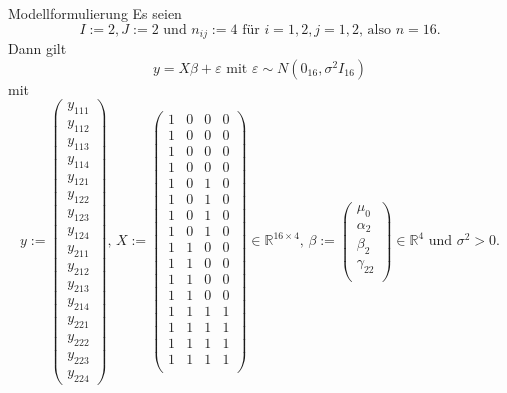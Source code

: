 \documentclass[
  8pt,
  ignorenonframetext,
]{beamer}
\begin{document}
\begin{frame}{Modellformulierung}
Es seien \begin{equation}
I := 2, J := 2 \mbox{ und } n_{ij} := 4 \mbox{ für } i = 1,2, j = 1,2 \mbox{, also } n = 16.
\end{equation} Dann gilt \begin{equation}
y = X\beta + \varepsilon \mbox{ mit } \varepsilon \sim N(0_{16},\sigma^2 I_{16})
\end{equation} mit \footnotesize \begin{equation}
y :=
\begin{pmatrix}
y_{111} \\
y_{112} \\
y_{113} \\
y_{114} \\
y_{121} \\
y_{122} \\
y_{123} \\
y_{124} \\
y_{211} \\
y_{212} \\
y_{213} \\
y_{214} \\
y_{221} \\
y_{222} \\
y_{223} \\
y_{224}
\end{pmatrix},
\,
X :=
\begin{pmatrix}
1  &  0  &   0   &  0  \\
1  &  0  &   0   &  0  \\
1  &  0  &   0   &  0  \\
1  &  0  &   0   &  0  \\
1  &  0  &   1   &  0  \\
1  &  0  &   1   &  0  \\
1  &  0  &   1   &  0  \\
1  &  0  &   1   &  0  \\
1  &  1  &   0   &  0  \\
1  &  1  &   0   &  0  \\
1  &  1  &   0   &  0  \\
1  &  1  &   0   &  0  \\
1  &  1  &   1   &  1  \\
1  &  1  &   1   &  1  \\
1  &  1  &   1   &  1  \\
1  &  1  &   1   &  1  \\
\end{pmatrix}
\in \mathbb{R}^{16 \times 4},
\,
\beta :=
\begin{pmatrix}
\mu_0       \\
\alpha_2    \\
\beta_2     \\
\gamma_{22} \\
\end{pmatrix}
\in \mathbb{R}^{4}
\mbox{ und }
\sigma^2 > 0.
\end{equation}
\end{frame}
\end{document}
